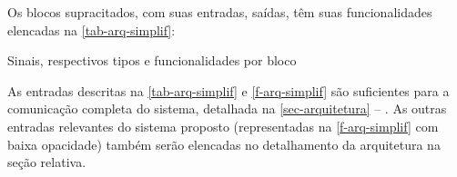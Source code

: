 Os blocos supracitados, com suas entradas, saídas, têm suas funcionalidades elencadas na \autoref{tab-arq-simplif}:

\begin{table}[H]
    \centering
    \caption{Sinais, respectivos tipos e funcionalidades por bloco}
    
    \label{tab-arq-simplif}
\end{table}

As entradas descritas na \autoref{tab-arq-simplif} e \autoref{f-arq-simplif} são suficientes para a comunicação completa do sistema,  detalhada na \autoref{sec-arquitetura} -- . As outras entradas relevantes do sistema proposto (representadas na \autoref{f-arq-simplif} com baixa opacidade) também serão elencadas no detalhamento da arquitetura na seção relativa.








 

